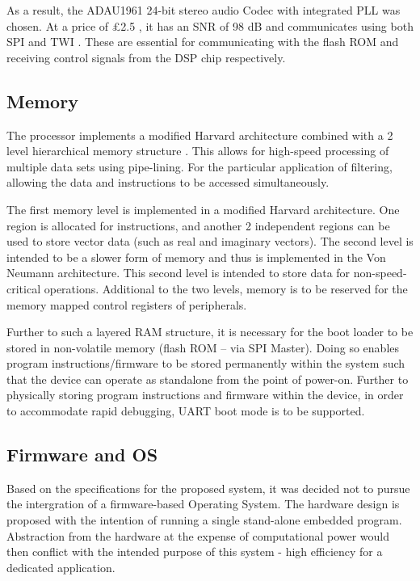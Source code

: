 As a result, the ADAU1961 24-bit stereo audio Codec with integrated PLL was chosen. At a price of £2.5 \autocite{digikeyCodec}, it has an SNR of 98 dB and communicates using both SPI and TWI \autocite{codec_datasheet}. These are essential for communicating with the flash ROM and receiving control signals from the DSP chip respectively.



\subsection{Memory}
The processor implements a modified Harvard architecture combined with a 2 level hierarchical memory structure \autocite{blackfinDSP}. This allows for high-speed processing of multiple data sets using pipe-lining. For the particular application of filtering, allowing the data and instructions to be accessed simultaneously.

The first memory level is implemented in a modified Harvard architecture. One region is allocated for instructions, and another 2 independent regions can be used to store vector data (such as real and imaginary vectors). The second level is intended to be a slower form of memory and thus is implemented in the Von Neumann architecture. This second level is intended to store data for non-speed-critical operations. Additional to the two levels, memory is to be reserved for the memory mapped control registers of peripherals. 

Further to such a layered RAM structure, it is necessary for the boot loader to be stored in non-volatile memory (flash ROM – via SPI Master). Doing so enables program instructions/firmware to be stored permanently within the system such that the device can operate as standalone from the point of power-on. Further to physically storing program instructions and firmware within the device, in order to accommodate rapid debugging, UART boot mode is to be supported.

\subsection{Firmware and OS}
Based on the specifications for the proposed system, it was decided not to pursue the intergration of a firmware-based Operating System. The hardware design is proposed with the intention of running a single stand-alone embedded program. Abstraction from the hardware at the expense of computational power would then conflict with the intended purpose of this system - high efficiency for a dedicated application. 


